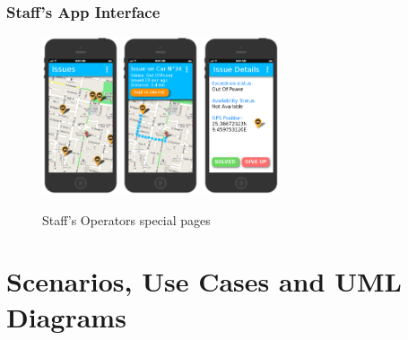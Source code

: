 \documentclass[11pt]{article} %
\begin{document}
\subsubsection{Staff's App Interface}
\begin{figure}[H]
	\centering
	\includegraphics[width=0.2\textwidth]{mockup/AIssues.png} \hspace{0.8cm}
	\includegraphics[width=0.2\textwidth]{mockup/BSelectedIssue.png} \hspace{0.8cm}
	\includegraphics[width=0.2\textwidth]{mockup/CIssueDetail.png}
	\caption{Staff's Operators special pages}
\end{figure}
  

\newpage
\section{Scenarios, Use Cases and UML Diagrams}
\end{document}
